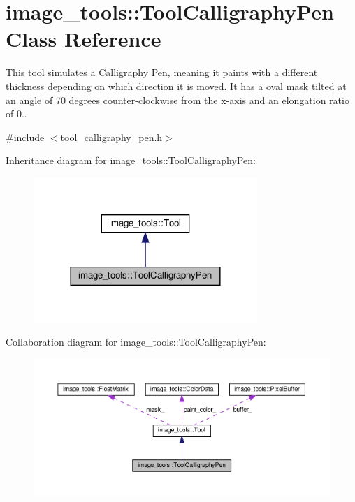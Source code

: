 \hypertarget{classimage__tools_1_1ToolCalligraphyPen}{}\section{image\+\_\+tools\+:\+:Tool\+Calligraphy\+Pen Class Reference}
\label{classimage__tools_1_1ToolCalligraphyPen}


This tool simulates a Calligraphy Pen, meaning it paints with a different thickness depending on which direction it is moved. It has a oval mask tilted at an angle of 70 degrees counter-\/clockwise from the x-\/axis and an elongation ratio of 0..  




{\ttfamily \#include $<$tool\+\_\+calligraphy\+\_\+pen.\+h$>$}



Inheritance diagram for image\+\_\+tools\+:\+:Tool\+Calligraphy\+Pen\+:
\nopagebreak
\begin{figure}[H]
\begin{center}
\leavevmode
\includegraphics[width=240pt]{classimage__tools_1_1ToolCalligraphyPen__inherit__graph}
\end{center}
\end{figure}


Collaboration diagram for image\+\_\+tools\+:\+:Tool\+Calligraphy\+Pen\+:
\nopagebreak
\begin{figure}[H]
\begin{center}
\leavevmode
\includegraphics[width=350pt]{classimage__tools_1_1ToolCalligraphyPen__coll__graph}
\end{center}
\end{figure}
